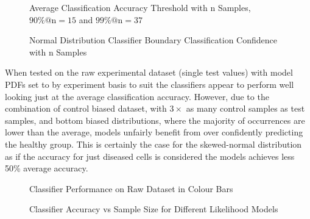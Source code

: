 \documentclass[
  paper=a4,
  ,captions=tableheading
]{scrartcl}
\makeatletter
\newcommand*\pandocbounded[1]{%
  \sbox\pandoc@box{#1}%
  \Gscale@div\@tempa{\textheight}{\dimexpr\ht\pandoc@box+\dp\pandoc@box\relax}%
  \Gscale@div\@tempb{\linewidth}{\wd\pandoc@box}%
  \ifdim\@tempb\p@<\@tempa\p@\let\@tempa\@tempb\fi%
  \ifdim\@tempa\p@<\p@\scalebox{\@tempa}{\usebox\pandoc@box}%
  \else\usebox{\pandoc@box}%
  \fi%
}
\makeatother
\begin{document}
\noindent
\begin{minipage}[t]{0.48\textwidth}
\begin{figure}
\centering
\pandocbounded{}
\caption{Average Classification Accuracy Threshold with n Samples,
\(90 \% @ \text{n}=15\) and \(99 \% @ \text{n}=37\)}
\end{figure}
\end{minipage}
\hfill
\begin{minipage}[t]{0.48\textwidth}
\begin{figure}
\centering
\pandocbounded{}
\caption{Normal Distribution Classifier Boundary Classification
Confidence with n Samples}
\end{figure}
\end{minipage}

When tested on the raw experimental dataset (single test values) with
model PDFs set to by experiment basis to suit the classifiers appear to
perform well looking just at the average classification accuracy.
However, due to the combination of control biased dataset, with
\(3\times\) as many control samples as test samples, and bottom biased
distributions, where the majority of occurrences are lower than the
average, models unfairly benefit from over confidently predicting the
healthy group. This is certainly the case for the skewed-normal
distribution as if the accuracy for just diseased cells is considered
the models achieves less 50\% average accuracy.

\noindent
\begin{minipage}[t]{0.48\textwidth}
\begin{figure}
\centering
\pandocbounded{}
\caption{Classifier Performance on Raw Dataset in Colour Bars}
\end{figure}
\end{minipage}
\hfill
\begin{minipage}[t]{0.48\textwidth}
\begin{figure}
\centering
\pandocbounded{}
\caption{Classifier Accuracy vs Sample Size for Different Likelihood
Models}
\end{figure}
\end{minipage}
\end{document}

